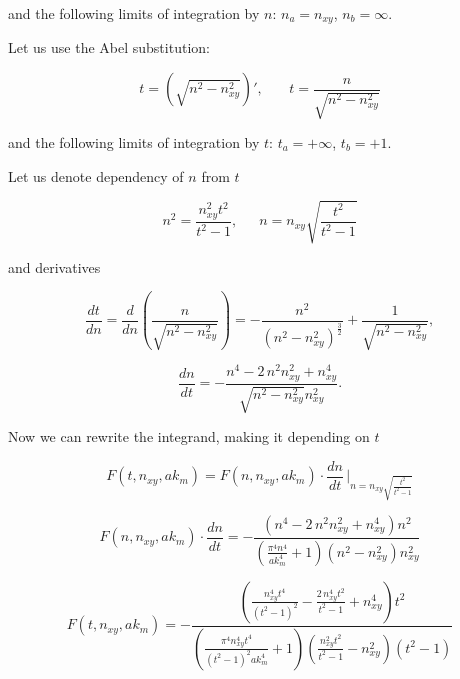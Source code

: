 \documentclass[twoside, 10pt]{article}
\begin{document}
\begin{multicols}{2}
    and the following limits of integration by \(n\): \(n_a = n_{xy}\),
\(n_b = \infty\).

    Let us use the Abel substitution:

\begin{equation}
t = \left(\sqrt{n^2-n_{xy}^2}\right)', \,\,\,\,\,\,\,\,\,\,\, t = \frac{n}{\sqrt{n^{2} - n_{\mathit{xy}}^{2}}}
\end{equation}

    and the following limits of integration by \(t\): \(t_a = +\infty\),
\(t_b = +1\).

    Let us denote dependency of \(n\) from \(t\)

\begin{equation}
n^{2} = \frac{n_{\mathit{xy}}^{2} t^{2}}{t^{2} - 1}, \,\,\,\,\,\,\,\,\, n = n_{\mathit{xy}} \sqrt{\frac{t^{2}}{t^{2} - 1}}
\end{equation}

    and derivatives

    \[\frac{dt}{dn} = \frac{d}{dn} \left( \frac{n}{\sqrt{n^{2} - n_{\mathit{xy}}^{2}}} \right)= -\frac{n^{2}}{{\left(n^{2} - n_{\mathit{xy}}^{2}\right)}^{\frac{3}{2}}} + \frac{1}{\sqrt{n^{2} - n_{\mathit{xy}}^{2}}},\]

\begin{equation}
\frac{dn}{dt} = -\frac{n^{4} - 2 \, n^{2} n_{\mathit{xy}}^{2} + n_{\mathit{xy}}^{4}}{\sqrt{n^{2} - n_{\mathit{xy}}^{2}} n_{\mathit{xy}}^{2}}.
\end{equation}

    Now we can rewrite the integrand, making it depending on \(t\)

    \[F\left(t, n_{xy}, ak_m\right) = F\left(n, n_{xy}, ak_m\right) \cdot \frac{dn}{dt} \, \Bigg\rvert_{ n = n_{\mathit{xy}} \sqrt{\frac{t^{2}}{t^{2} - 1}} }\]

\[F\left(n, n_{xy}, ak_m\right) \cdot \frac{dn}{dt} = -\frac{{\left(n^{4} - 2 \, n^{2} n_{\mathit{xy}}^{2} + n_{\mathit{xy}}^{4}\right)} n^{2}}{{\left(\frac{\pi^{4} n^{4}}{\mathit{ak}_{m}^{4}} + 1\right)} {\left(n^{2} - n_{\mathit{xy}}^{2}\right)} n_{\mathit{xy}}^{2}}\]

\[F\left(t, n_{xy}, ak_m\right) = -\frac{{\left(\frac{n_{\mathit{xy}}^{4} t^{4}}{{\left(t^{2} - 1\right)}^{2}} - \frac{2 \, n_{\mathit{xy}}^{4} t^{2}}{t^{2} - 1} + n_{\mathit{xy}}^{4}\right)} t^{2}}{{\left(\frac{\pi^{4} n_{\mathit{xy}}^{4} t^{4}}{{\left(t^{2} - 1\right)}^{2} \mathit{ak}_{m}^{4}} + 1\right)} {\left(\frac{n_{\mathit{xy}}^{2} t^{2}}{t^{2} - 1} - n_{\mathit{xy}}^{2}\right)} {\left(t^{2} - 1\right)}}\]


\end{multicols}
\end{document}
